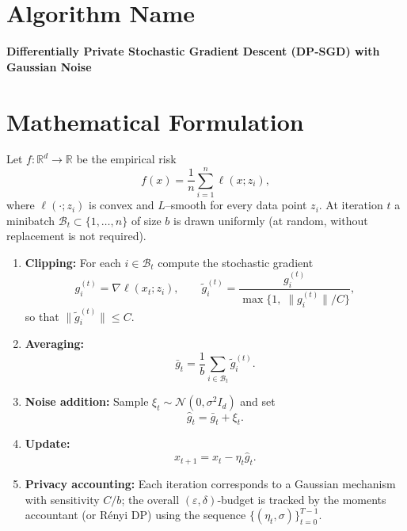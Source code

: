 \documentclass{article}
\newcommand{\RR}{\mathbb{R}}
\begin{document}
\section*{Algorithm Name}
\textbf{Differentially Private Stochastic Gradient Descent (DP‑SGD) with Gaussian Noise}

\section*{Mathematical Formulation}
Let $f:\RR^{d}\to\RR$ be the empirical risk
\[
f(x)=\frac{1}{n}\sum_{i=1}^{n}\ell(x;z_i),
\]
where $\ell(\cdot;z_i)$ is convex and $L$–smooth for every data point $z_i$.
At iteration $t$ a minibatch $\mathcal{B}_t\subset\{1,\dots,n\}$ of size $b$ is drawn uniformly
(at random, without replacement is not required).  

\begin{enumerate}
\item \textbf{Clipping:} For each $i\in\mathcal{B}_t$ compute the stochastic gradient
\[
g_i^{(t)}=\nabla\ell(x_t;z_i),\qquad 
\tilde g_i^{(t)}=\frac{g_i^{(t)}}{\max\{1,\; \|g_i^{(t)}\|/C\}},
\]
so that $\|\tilde g_i^{(t)}\|\le C$.
\item \textbf{Averaging:}
\[
\bar g_t=\frac{1}{b}\sum_{i\in\mathcal{B}_t}\tilde g_i^{(t)} .
\]
\item \textbf{Noise addition:} Sample $\xi_t\sim\mathcal N(0,\sigma^{2}I_d)$ and set
\[
\hat g_t=\bar g_t+\xi_t .
\]
\item \textbf{Update:}
\[
x_{t+1}=x_t-\eta_t \hat g_t .
\]
\item \textbf{Privacy accounting:} Each iteration corresponds to a Gaussian
mechanism with sensitivity $C/b$; the overall $(\varepsilon,\delta)$‑budget is
tracked by the moments accountant (or Rényi DP) using the sequence
$\{(\eta_t,\sigma)\}_{t=0}^{T-1}$.
\end{enumerate}
\end{document}
